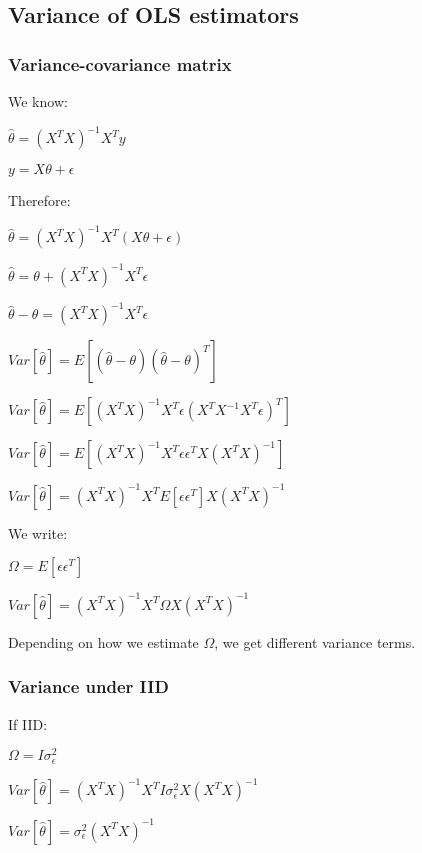 
\subsection{Variance of OLS estimators}

\subsubsection{Variance-covariance matrix}

We know:

\(\hat \theta =(X^TX)^{-1}X^Ty\)

\(y=X\theta +\epsilon\)

Therefore:

\(\hat \theta =(X^TX)^{-1}X^T(X\theta +\epsilon)\)

\(\hat \theta =\theta +(X^TX)^{-1}X^T\epsilon\)

\(\hat \theta -\theta =(X^TX)^{-1}X^T\epsilon\)

\(Var [\hat \theta ]=E[(\hat \theta -\theta)(\hat \theta -\theta )^T]\)

\(Var [\hat \theta ]=E[(X^TX)^{-1}X^T\epsilon(X^TX^{-1}X^T\epsilon )^T]\)

\(Var [\hat \theta ]=E[(X^TX)^{-1}X^T\epsilon \epsilon^T X(X^TX)^{-1}]\)

\(Var [\hat \theta ]=(X^TX)^{-1}X^TE[\epsilon \epsilon^T ]X(X^TX)^{-1}\)

We write:

\(\Omega=E[\epsilon \epsilon^T]\)

\(Var [\hat \theta ]=(X^TX)^{-1}X^T\Omega X(X^TX)^{-1}\)

Depending on how we estimate \(\Omega\), we get different variance terms.

\subsubsection{Variance under IID}

If IID:

\(\Omega = I\sigma^2_{\epsilon }\)

\(Var [\hat \theta ]=(X^TX)^{-1}X^TI\sigma^2_{\epsilon } X(X^TX)^{-1}\)

\(Var [\hat \theta ]=\sigma^2_\epsilon (X^TX)^{-1}\)

